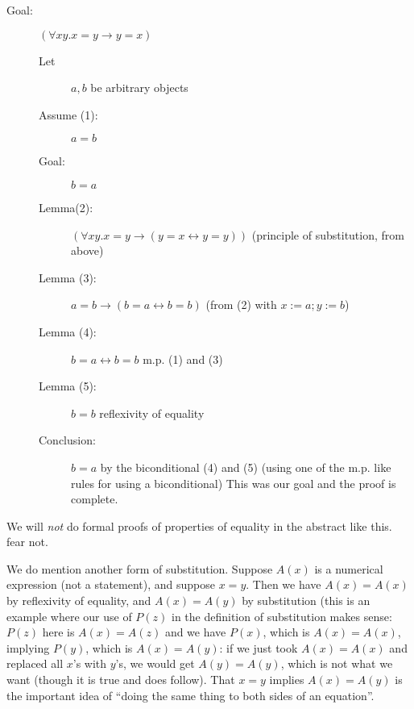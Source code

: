 \documentclass[12pt]{article}
\begin{document}
\begin{description}

\item[Goal:]  $(\forall xy.x=y \rightarrow y=x)$

\begin{description}

\item[Let] $a,b$ be arbitrary objects

\item[Assume (1):]  $a=b$

\item[Goal:] $b=a$

\item[Lemma(2):]  $(\forall xy.x=y \rightarrow (y=x \leftrightarrow y=y))$ (principle of substitution, from above)

\item[Lemma (3):]  $a=b \rightarrow (b=a \leftrightarrow b=b)$ (from (2) with
$x:=a; y:=b$)

\item[Lemma (4):] $b=a \leftrightarrow b=b$  m.p. (1) and (3)

\item[Lemma (5):] $b=b$  reflexivity of equality

\item[Conclusion:] $b=a$ by the biconditional (4) and (5) (using one
of the m.p. like rules for using a biconditional) This was our goal
and the proof is complete.

\end{description}

\end{description}

We will {\em not\/} do formal proofs of properties of equality in the abstract like this. fear not.

We do mention another form of substitution.  Suppose $A(x)$ is a
numerical expression (not a statement), and suppose $x=y$.  Then we
have $A(x) = A(x)$ by reflexivity of equality, and $A(x) = A(y)$ by
substitution (this is an example where our use of $P(z)$ in the
definition of substitution makes sense: $P(z)$ here is $A(x) = A(z)$
and we have $P(x)$, which is $A(x) = A(x)$, implying $P(y)$, which is
$A(x)=A(y)$: if we just took $A(x)=A(x)$ and replaced all $x$'s with
$y$'s, we would get $A(y)=A(y)$, which is not what we want (though it
is true and does follow).  That $x=y$ implies $A(x)=A(y)$ is the
important idea of ``doing the same thing to both sides of an
equation''.
\end{document}
